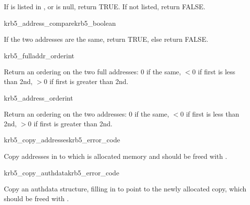 If  is listed in , or
 is null, return TRUE.  If not listed, return FALSE.

\begin{funcdecl}{krb5_address_compare}{krb5_boolean}{\funcinout}
\funcin
{}
\end{funcdecl}

If the two addresses are the same, return TRUE, else return FALSE.

\begin{funcdecl}{krb5_fulladdr_order}{int}{\funcinout}
\funcin
{}
\end{funcdecl}

Return an ordering on the two full addresses:  0 if the same,
$< 0$ if first is less than 2nd, $> 0$ if first is greater than 2nd.

\begin{funcdecl}{krb5_address_order}{int}{\funcinout}
\funcin
{}
\end{funcdecl}

Return an ordering on the two addresses:  0 if the same,
$< 0$ if first is less than 2nd, $> 0$ if first is greater than 2nd.

\begin{funcdecl}{krb5_copy_addresses}{krb5_error_code}{\funcinout}
\funcin
{}
\funcout
{}
\end{funcdecl}

Copy addresses in  to  which is
allocated memory and should be freed with .

\begin{funcdecl}{krb5_copy_authdata}{krb5_error_code}{\funcinout}
\funcin
{}
\funcout
{}
\end{funcdecl}

Copy an authdata structure, filling in  to point to the
newly allocated copy, which should be freed with 
.

